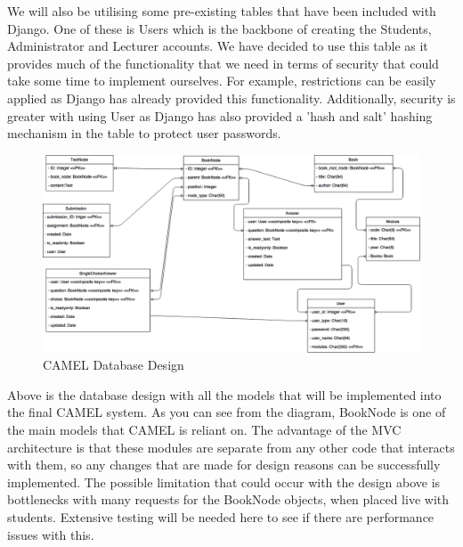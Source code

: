 	We will also be utilising some pre-existing tables that have been included with Django. One of these is Users which is the backbone of creating the Students, Administrator and Lecturer accounts. We have decided to use this table as it provides much of the functionality that we need in terms of security that could take some time to implement ourselves. For example, restrictions can be easily applied as Django has already provided this functionality. Additionally, security is greater with using User as Django has also provided a 'hash and salt' hashing mechanism in the table to protect user passwords.\\	
	
	\begin{figure}[h]
		\includegraphics[scale=0.45]{img/database_design}
		\caption{CAMEL Database Design}
	\end{figure}
	
	Above is the database design with all the models that will be implemented into the final CAMEL system. As you can see from the diagram, BookNode is one of the main models that CAMEL is reliant on. The advantage of the MVC architecture is that these modules are separate from any other code that interacts with them, so any changes that are made for design reasons can be successfully implemented. The possible limitation that could occur with the design above is bottlenecks with many requests for the BookNode objects, when placed live with students. Extensive testing will be needed here to see if there are performance issues with this.\\